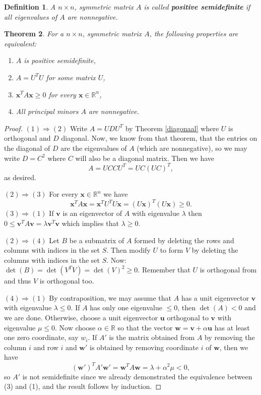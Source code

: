 \documentclass[a4paper,11pt]{report}
\newtheorem{theorem}{Theorem}[section]
\newtheorem{definition}[theorem]{Definition}
\newcommand{\R}{{\mathbb R}}
\begin{document}
\begin{definition}
  A $n\times n$, symmetric matrix $A$ is called \textbf{positive semidefinite} if
all eigenvalues of $A$ are nonnegative.
\end{definition}
\begin{theorem}
  For a $n \times n$, symmetric matrix $A$, the following properties are equivalent:
  \begin{enumerate}
    \item $A$ is positive semidefinite,
    \item $A = U^T U$ for some matrix $U$,
    \item $\mathbf{x}^T A \mathbf{x} \geq 0$ for every $\mathbf{x} \in \R^n$,
    \item All principal minors $A$ are nonnegative.
  \end{enumerate}
\end{theorem}
\begin{proof}
  $(1)\Rightarrow (2)$ Write $A = UDU^T$ by Theorem \ref{diagonaal} where $U$ is 
  orthogonal and $D$ diagonal. Now, we know from that theorem, that the entries 
  on the diagonal of $D$ are the eigenvalues of $A$ (which are nonnegative), so 
  we may write $D = C^2$ where $C$ will also be a diagonal matrix. Then we have 
  $$A = UCCU^T = UC(UC)^T,$$
  as desired.
  
 $(2)\Rightarrow (3)$ For every $\mathbf{x} \in \R^n$ we have 
  $$\mathbf{x}^T A \mathbf{x} = \mathbf{x}^T U^T U \mathbf{x} = (U\mathbf{x})^T(U\mathbf{x}) 
  \geq 0.$$
 $(3)\Rightarrow (1)$ If $\mathbf{v}$ is an eigenvector of $A$ with eigenvalue $\lambda$ 
  then $0 \leq \mathbf{v}^T A \mathbf{v} = \lambda \mathbf{v}^T \mathbf{v}$ 
  which implies that $\lambda \geq 0$.
  
  $(2) \Rightarrow (4)$ Let $B$ be a submatrix of $A$ formed by deleting the rows 
  and columns with indices in the set $S$. Then modify $U$ to form $V$ by 
  deleting the columns with indices in the set $S$. Now: $\det(B) = \det(V^TV) = \det(V)^2 \geq 
  0$. Remember that $U$ is orthogonal from and thus $V$ is orthogonal too.
  
  $(4) \Rightarrow (1)$ By contraposition, we may assume that $A$ has a unit 
  eigenvector $\mathbf{v}$ with eigenvalue $\lambda \leq 0$. If $A$ has only one 
  eigenvalue $\leq 0$, then $\det(A) < 0$ and we are done. Otherwise, choose a 
  unit eigenvector $\mathbf{u}$ orthogonal to $\mathbf{v}$ with eigenvalue $\mu \leq 
  0$. Now choose $\alpha \in \R$ so that the vector $\mathbf{w} = \mathbf{v} + \alpha \mathbf{u}$ 
  has at least one zero coordinate, say $w_i$. If $A'$ is the matrix obtained 
  from $A$ by removing the column $i$ and row $i$ and $\mathbf{w'}$ is obtained 
  by removing coordinate $i$ of $\mathbf{w}$, then we have 
  $$(\mathbf{w'})^T A' \mathbf{w}' = \mathbf{w}^T A \mathbf{w} = \lambda + \alpha^2 \mu < 
  0, $$
  so $A'$ is not semidefinite since we already demonstrated the equivalence 
  between (3) and (1), and the result follows by induction.
 \end{proof}
\end{document}
